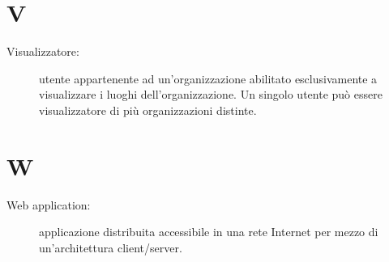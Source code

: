 \documentclass{article}
\begin{document}
	\section{V}
	\begin{description}
		\item[Visualizzatore:] utente appartenente ad un'organizzazione abilitato esclusivamente a visualizzare i luoghi dell'organizzazione. Un singolo utente può essere visualizzatore di più organizzazioni distinte.
	\end{description}
	\newpage
	\section{W}
	\begin{description}
		\item[Web application:] applicazione distribuita accessibile in una rete Internet per mezzo di un'architettura client/server.
	\end{description}
	\newpage
\end{document}
